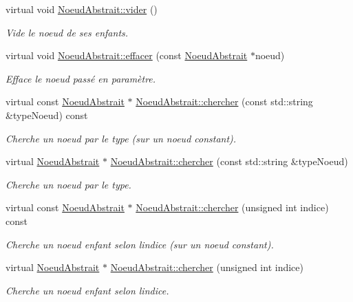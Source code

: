 \begin{DoxyCompactItemize}
virtual void \hyperlink{group__inf2990_ga55435ee83860c6a2101334ba67bbd9b6}{Noeud\+Abstrait\+::vider} ()
\begin{DoxyCompactList}\small\item\em Vide le noeud de ses enfants. \end{DoxyCompactList}\item 
virtual void \hyperlink{group__inf2990_ga2ab3dc520026d1ad77aa848981688bfd}{Noeud\+Abstrait\+::effacer} (const \hyperlink{class_noeud_abstrait}{Noeud\+Abstrait} $\ast$noeud)
\begin{DoxyCompactList}\small\item\em Efface le noeud passé en paramètre. \end{DoxyCompactList}\item 
virtual const \hyperlink{class_noeud_abstrait}{Noeud\+Abstrait} $\ast$ \hyperlink{group__inf2990_gaeda0df98faf404765d985fcde60fb924}{Noeud\+Abstrait\+::chercher} (const std\+::string \&type\+Noeud) const 
\begin{DoxyCompactList}\small\item\em Cherche un noeud par le type (sur un noeud constant). \end{DoxyCompactList}\item 
virtual \hyperlink{class_noeud_abstrait}{Noeud\+Abstrait} $\ast$ \hyperlink{group__inf2990_ga0868ae108165b071f6c8a68a7265c770}{Noeud\+Abstrait\+::chercher} (const std\+::string \&type\+Noeud)
\begin{DoxyCompactList}\small\item\em Cherche un noeud par le type. \end{DoxyCompactList}\item 
virtual const \hyperlink{class_noeud_abstrait}{Noeud\+Abstrait} $\ast$ \hyperlink{group__inf2990_gac334b078c318e39a065b85572778bf13}{Noeud\+Abstrait\+::chercher} (unsigned int indice) const 
\begin{DoxyCompactList}\small\item\em Cherche un noeud enfant selon l\textquotesingle{}indice (sur un noeud constant). \end{DoxyCompactList}\item 
virtual \hyperlink{class_noeud_abstrait}{Noeud\+Abstrait} $\ast$ \hyperlink{group__inf2990_ga13f7e9a637f7439b1a0cec0c49f6fa88}{Noeud\+Abstrait\+::chercher} (unsigned int indice)
\begin{DoxyCompactList}\small\item\em Cherche un noeud enfant selon l\textquotesingle{}indice. \end{DoxyCompactList}\item 

\end{DoxyCompactItemize}

